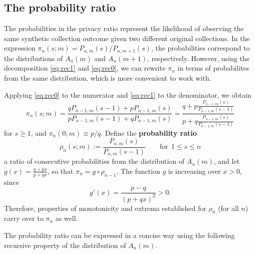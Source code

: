 \documentclass[11pt,draft]{article}
\begin{document}
\subsection{The probability ratio}

The probabilities in the privacy ratio represent the likelihood of observing
the same synthetic collection outcome given two different original collections.
In the expression $\pi_n(s;m) = P_{n,m}(s) / P_{n,m+1}(s)$, the probabilities
correspond to the distributions of $A_n(m)$ and $A_n(m+1)$, respectively.
However, using the decomposition \eqref{eq:rec1} and \eqref{eq:rec0}, we can
rewrite $\pi_n$ in terms of probabilites from the same distribution, which is
more convenient to work with.

Applying \eqref{eq:rec0} to the numerator and \eqref{eq:rec1} to the denominator,
we obtain
\[ \pi_n(s;m) =
\frac{qP_{n-1,m}(s-1) + pP_{n-1,m}(s)}{pP_{n-1,m}(s-1) + qP_{n-1,m}(s)} =
\frac{q + p \frac{P_{n-1,m}(s)}{P_{n-1,m}(s-1)}}
    {p + q \frac{P_{n-1,m}(s)}{P_{n-1,m}(s-1)}}
\]
for $s \geq 1$, and $\pi_n(0;m) \equiv p/q$.
Define the \textbf{probability ratio}
\[ \rho_n(s;m) := \frac{P_{n,m}(s)}{P_{n,m}(s-1)}
\qquad\text{for}\ \ 1 \leq s\leq n \]
a ratio of consecutive probabilities from the distribution of $A_n(m)$, and let
$g(x) = \frac{q + px}{p + qx}$, so that $\pi_n = g \circ \rho_{n-1}$.
The function $g$ is increasing over $x>0$, since
\[ g'(x) = \frac{p-q}{(p+qx)^2} > 0. \]
Therefore, properties of monotonicity and extrema established for $\rho_n$ (for
all $n$) carry over to $\pi_n$ as well.

The probability ratio can be expressed in a concise way using the following 
recursive property of the distribution of $A_n(m)$.
\end{document}
